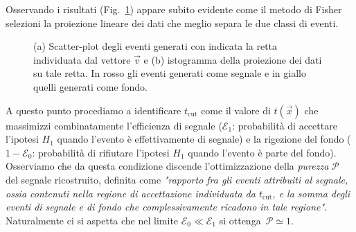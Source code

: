 \noindent Osservando i risultati (Fig.~\ref{Es7Fig1-2}) appare subito evidente come il metodo di Fisher selezioni la proiezione lineare dei dati che meglio separa le due classi di eventi.\\

\begin{figure}
	\centering
	\caption{(a) Scatter-plot degli eventi generati con indicata la retta individuata dal vettore $\vec{v}$ e (b) istogramma della proiezione dei dati su tale retta. In rosso gli eventi generati come segnale e in giallo quelli generati come fondo.}
	\label{Es7Fig1-2}
\end{figure}

\noindent A questo punto procediamo a identificare $t_\mathrm{cut}$ come il valore di $t(\vec{x})$ che massimizzi combinatamente l'efficienza di segnale ($\mathcal{E}_1$: probabilità di accettare l'ipotesi $H_1$ quando l'evento è effettivamente di segnale) e la rigezione del fondo ($1-\mathcal{E}_0$: probabilità di rifiutare l'ipotesi $H_1$ quando l'evento è parte del fondo). Osserviamo che da questa condizione discende l'ottimizzazione della \emph{purezza} $\mathcal{P}$ del segnale ricostruito, definita come \emph{"rapporto fra gli eventi attribuiti al segnale, ossia contenuti nella regione di accettazione individuata da $t_\mathrm{cut}$, e la somma degli eventi di segnale e di fondo che complessivamente ricadono in tale regione"}. Naturalmente ci si aspetta che nel limite $\mathcal{E}_0\ll\mathcal{E}_1$ si ottenga~$\mathcal{P} \simeq 1$.\\


